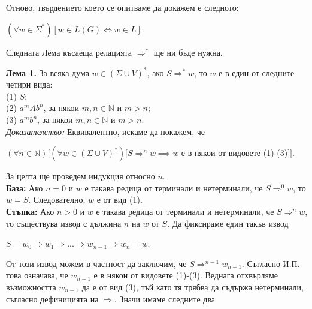 \documentclass[openany]{book}
\begin{document}
    Отново, твърдението което се опитваме да докажем е следното: \\
    \begin{center}
        $(\forall w \in \Sigma^*)[w \in L(G) \iff w \in L]$.
    \end{center}

    Следната Лема късаеща релацията $\Rightarrow^*$ ще ни бъде нужна. \\

    \vspace{5pt}
    
    \hspace{15pt}\textbf{Лема 1.} За всяка дума $w \in (\Sigma \cup V)^*$, ако 
    $S \Rightarrow^* w$, то $w$ е в един от следните четири вида: \\
    (1) $S$; \\
    (2) $a^mAb^n$, за някои $m,n \in \mathbb{N}$ и $m > n$;\\
    (3) $a^mb^n$, за някои $m,n \in \mathbb{N}$ и $m > n$. \\
    \textit{Доказателство:} Еквивалентно, искаме да покажем, че \\
    \begin{center}
        $(\forall n \in \mathbb{N})[(\forall w \in (\Sigma \cup V)^*)[S \Rightarrow^n w \implies w$ е в някои от видовете (1)-(3)$]]$.
    \end{center}
        За целта ще проведем индукция относно $n$. \\
        \vspace{5pt}
        \textbf{База:} Ако $n = 0$ и $w$ е такава редица от терминали и нетерминали, че
        $S \Rightarrow^0 w$, то $w = S$. Следователно, $w$ е от вид (1). \\
        \vspace{5pt}
        \textbf{Стъпка:} Ако $n > 0$ и $w$ е такава редица от терминали и нетерминали,
        че $S \Rightarrow^n w$, то съществува извод с дължина $n$ на $w$ от $S$. Да 
        фиксираме един такъв извод \\
        \begin{center}
            $S = w_0 \Rightarrow w_1 \Rightarrow ... \Rightarrow w_{n-1} \Rightarrow w_n = w$.
        \end{center}
        От този извод можем в частност да заключим, че $S \Rightarrow^{n-1} w_{n-1}$. 
        Съгласно И.П. това означава, че $w_{n-1}$ е в някои от видовете (1)-(3). Веднага
        отхвърляме възможността $w_{n-1}$ да е от вид (3), тъй като тя трябва да съдържа
        нетерминали, съгласно дефиницията на $\Rightarrow$. Значи имаме следните два
\end{document}
